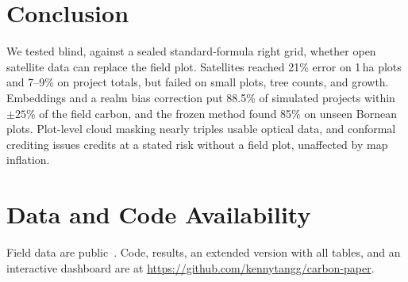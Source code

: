 \documentclass[conference,a4paper]{IEEEtran}
\begin{document}
\section{Conclusion}
We tested blind, against a sealed standard-formula right grid, whether open satellite data can replace the field plot. Satellites reached 21\% error on 1\,ha plots and 7--9\% on project totals, but failed on small plots, tree counts, and growth. Embeddings and a realm bias correction put 88.5\% of simulated projects within $\pm25$\% of the field carbon, and the frozen method found 85\% on unseen Bornean plots. Plot-level cloud masking nearly triples usable optical data, and conformal crediting issues credits at a stated risk without a field plot, unaffected by map inflation.

\section*{Data and Code Availability}
Field data are public~\cite{hcsa2023data,geotrees2024,labriere2018insitu,svatek2025safe}. Code, results, an extended version with all tables, and an interactive dashboard are at \url{https://github.com/kennytangg/carbon-paper}.
\end{document}
